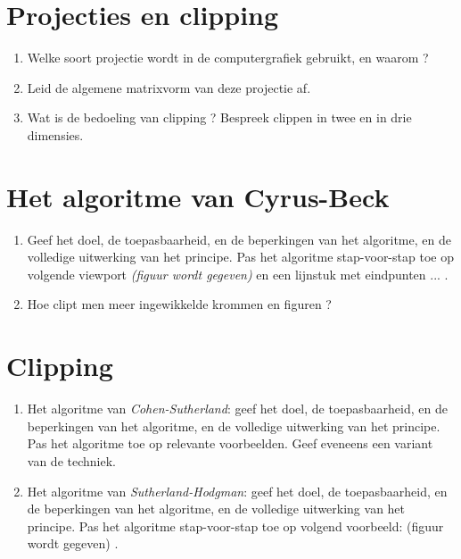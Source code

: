 \documentclass{report}
\begin{document}
	\section{Projecties en clipping}

	\begin{enumerate}
	\item Welke soort projectie wordt in de computergrafiek gebruikt, en waarom ?
	
	\item Leid de algemene matrixvorm van deze projectie af. 
	
	\item Wat is de bedoeling van clipping ? Bespreek clippen in twee en in drie dimensies. 
	\end{enumerate}

	\section{Het algoritme van Cyrus-Beck}
	\begin{enumerate}
		\item Geef het doel, de toepasbaarheid, en de beperkingen van het algoritme, en de volledige uitwerking van het principe. Pas het algoritme stap-voor-stap toe op volgende viewport \textit{(figuur wordt gegeven)} en een lijnstuk met eindpunten ... .  
		
		\item Hoe clipt men meer ingewikkelde krommen en figuren ?
	\end{enumerate}

	\section{Clipping}
	\begin{enumerate}
		\item Het algoritme van \textit{Cohen-Sutherland}: geef het doel, de toepasbaarheid, en de beperkingen van het algoritme, en de volledige uitwerking van het principe. Pas het algoritme toe op relevante voorbeelden. Geef eveneens een variant van de techniek. 
		
		\item Het algoritme van \textit{Sutherland-Hodgman}: geef het doel, de toepasbaarheid, en de beperkingen van het algoritme, en de volledige uitwerking van het principe. Pas het algoritme stap-voor-stap toe op volgend voorbeeld: (figuur wordt gegeven) . 
	\end{enumerate}
\end{document}
